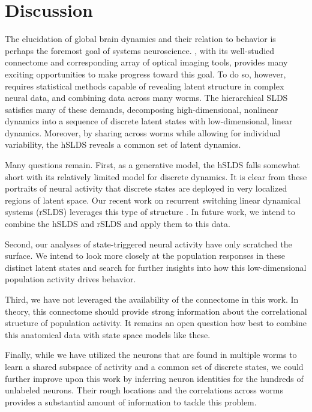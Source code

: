 \documentclass{article}
\begin{document}

\section{Discussion}
The elucidation of global brain dynamics and their relation to behavior
is perhaps the foremost goal of systems neuroscience. \celegans, with
its well-studied connectome and corresponding array of optical imaging tools,
provides many exciting opportunities to make progress toward this goal.
To do so, however, requires statistical methods capable of revealing latent
structure in complex neural data, and combining data across many worms.
The hierarchical SLDS satisfies many of these demands, decomposing
high-dimensional, nonlinear dynamics into a sequence of discrete latent
states with low-dimensional, linear dynamics. Moreover, by sharing across
worms while allowing for individual variability, the hSLDS reveals a
common set of latent dynamics.

Many questions remain. First, as a generative model, the hSLDS falls
somewhat short with its relatively limited model for discrete dynamics.
It is clear from these portraits of neural activity that discrete states
are deployed in very localized regions of latent space. Our recent work on
recurrent switching linear dynamical systems (rSLDS) leverages this type
of structure \citep{linderman2016recurrent}. In future work, we intend to
combine the hSLDS and rSLDS and apply them to this data.

Second, our analyses of state-triggered neural activity have only scratched
the surface. We intend to look more closely at the population responses
in these distinct latent states and search for further insights into how
this low-dimensional population activity drives behavior.

Third, we have not leveraged the availability of the \celegans connectome
in this work. In theory, this connectome should provide strong information
about the correlational structure of population activity. It remains an
open question how best to combine this anatomical data with state space
models like these.

Finally, while we have utilized the neurons that are found in multiple
worms to learn a shared subspace of activity and a common set of discrete
states, we could further improve upon this work by inferring neuron
identities for the hundreds of unlabeled neurons.  Their rough locations
and the correlations across worms provides a substantial amount of information
to tackle this problem.
\end{document}
